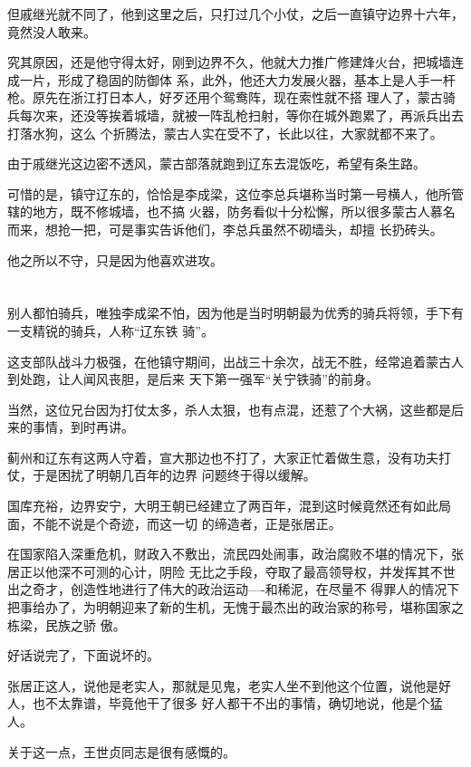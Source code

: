 \documentclass[11pt,a4paper,onecolumn]{article}
\begin{document}
但戚继光就不同了，他到这里之后，只打过几个小仗，之后一直镇守边界十六年，竟然没人敢来。

究其原因，还是他守得太好，刚到边界不久，他就大力推广修建烽火台，把城墙连成一片，形成了稳固的防御体
系，此外，他还大力发展火器，基本上是人手一杆枪。原先在浙江打日本人，好歹还用个鸳鸯阵，现在索性就不搭
理人了，蒙古骑兵每次来，还没等挨着城墙，就被一阵乱枪扫射，等你在城外跑累了，再派兵出去打落水狗，这么
个折腾法，蒙古人实在受不了，长此以往，大家就都不来了。

由于戚继光这边密不透风，蒙古部落就跑到辽东去混饭吃，希望有条生路。

可惜的是，镇守辽东的，恰恰是李成梁，这位李总兵堪称当时第一号横人，他所管辖的地方，既不修城墙，也不搞
火器，防务看似十分松懈，所以很多蒙古人慕名而来，想抢一把，可是事实告诉他们，李总兵虽然不砌墙头，却擅
长扔砖头。

他之所以不守，只是因为他喜欢进攻。

\section[\thesection]{}

别人都怕骑兵，唯独李成梁不怕，因为他是当时明朝最为优秀的骑兵将领，手下有一支精锐的骑兵，人称``辽东铁
骑''。

这支部队战斗力极强，在他镇守期间，出战三十余次，战无不胜，经常追着蒙古人到处跑，让人闻风丧胆，是后来
天下第一强军``关宁铁骑''的前身。

当然，这位兄台因为打仗太多，杀人太狠，也有点混，还惹了个大祸，这些都是后来的事情，到时再讲。

蓟州和辽东有这两人守着，宣大那边也不打了，大家正忙着做生意，没有功夫打仗，于是困扰了明朝几百年的边界
问题终于得以缓解。

国库充裕，边界安宁，大明王朝已经建立了两百年，混到这时候竟然还有如此局面，不能不说是个奇迹，而这一切
的缔造者，正是张居正。

在国家陷入深重危机，财政入不敷出，流民四处闹事，政治腐败不堪的情况下，张居正以他深不可测的心计，阴险
无比之手段，夺取了最高领导权，并发挥其不世出之奇才，创造性地进行了伟大的政治运动----和稀泥，在尽量不
得罪人的情况下把事给办了，为明朝迎来了新的生机，无愧于最杰出的政治家的称号，堪称国家之栋梁，民族之骄
傲。

好话说完了，下面说坏的。

张居正这人，说他是老实人，那就是见鬼，老实人坐不到他这个位置，说他是好人，也不太靠谱，毕竟他干了很多
好人都干不出的事情，确切地说，他是个猛人。

关于这一点，王世贞同志是很有感慨的。
\end{document}
